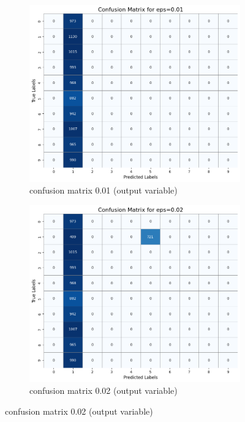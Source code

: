 \documentclass[11pt,onside]{article}
\begin{document}
\begin{figure}[h]
  \centering
  \begin{subfigure}[b]{0.49\textwidth}
    \centering
    \includegraphics[width=\textwidth]{V2_images/_correct_labels_confusion_matrix_eps_0.01.png}
    \caption{confusion matrix 0.01 (output variable)}
    \label{fig:image1}
  \end{subfigure}
  \hfill
  \begin{subfigure}[b]{0.49\textwidth}
    \centering
    \includegraphics[width=\textwidth]{V2_images/_correct_labels_confusion_matrix_eps_0.02.png}
    \caption{confusion matrix 0.02 (output variable)}
    \label{fig:image2}
  \end{subfigure}

  \label{fig:images}
\end{figure}
\end{document}
